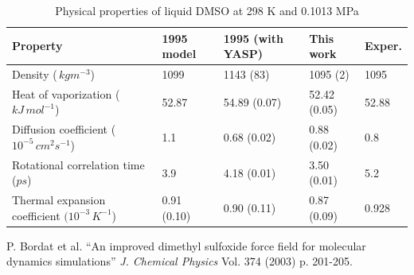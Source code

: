 \documentclass[11pt,letterpaper,twocolumn]{article}
\begin{document}
\lipsum[1]

\begin{table}[tp]%
\begin{center}
\begin{tabular}{|l|l|l|l|l|}
\hline
Property    & 1995 model & 1995 (with YASP) & This work   & Exper. \\ \hline \hline
Density ($ \,kg m^{-3}$)    & 1099  & 1143 (83) & 1095 (2)     & 1095   \\ \hline
Heat of vaporization ($kJ \,mol^{-1}$)  & 52.87 & 54.89 (0.07)     & 52.42 (0.05) & 52.88  \\ \hline
Diffusion coefficient ($10^{-5} \, cm^{2} s^{-1}$) & 1.1 &  0.68 (0.02)        & 0.88 (0.02)  & 0.8    \\ \hline
Rotational correlation time ($ps$)  & 3.9     &    4.18 (0.01) & 3.50 (0.01)& 5.2    \\ \hline
Thermal expansion coefficient $(10^{-3} \,K^{-1}$)  & 0.91 (0.10) & 0.90 (0.11) & 0.87 (0.09) & 0.928  \\ \hline
\end{tabular}
	\end{center}
	\caption{Physical properties of liquid DMSO at 298 K and 0.1013 MPa}
	\label{a}
\end{table}

\lipsum[1-8]


\begin{thebibliography}{9}
 P. Bordat et al. ``An improved dimethyl sulfoxide force field for molecular dynamics simulations'' \textit{J. Chemical Physics} Vol. 374 (2003) p. 201-205.
\end{thebibliography} 
\end{document}
